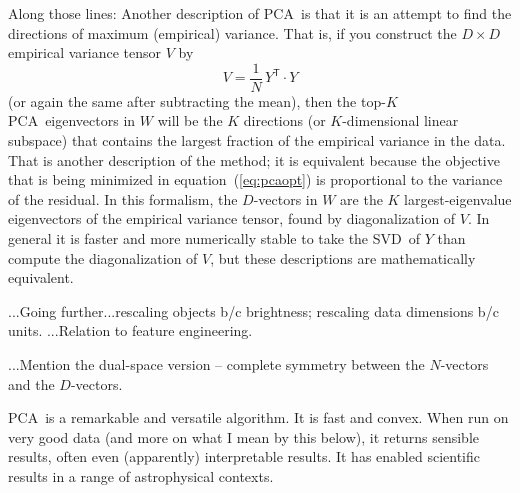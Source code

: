 \documentclass[12pt, twoside, letterpaper]{article}
\newcommand{\equationname}{equation}
\newcommand{\acronym}[1]{{\small{#1}}}
\newcommand{\PCA}{\acronym{PCA}}
\newcommand{\SVD}{\acronym{SVD}}
\newcommand{\T}{^{\mathsf{T}}}
\begin{document}
Along those lines:
Another description of \PCA\ is that it is an attempt to find the directions of
maximum (empirical) variance.
That is, if you construct the $D\times D$ empirical variance tensor $V$ by
\begin{equation}
V = \frac{1}{N}\,Y\T \cdot Y
\end{equation}
(or again the same after subtracting the mean),
then the top-$K$ \PCA\ eigenvectors in $W$ will be the $K$ directions (or $K$-dimensional
linear subspace) that contains the largest fraction of the empirical variance in the data.
That is another description of the method; it is equivalent
because the objective that is being minimized in \equationname~(\ref{eq:pcaopt})
is proportional to the variance of the residual.
In this formalism, the $D$-vectors in $W$ are the $K$ largest-eigenvalue
eigenvectors of the empirical variance tensor, found by diagonalization of $V$.
In general it is faster and more numerically stable to take the \SVD\ of $Y$
than compute the diagonalization of $V$, but these descriptions are mathematically
equivalent.

...Going further...rescaling objects b/c brightness; rescaling data dimensions b/c units.
...Relation to feature engineering.

...Mention the dual-space version -- complete symmetry between the $N$-vectors and the $D$-vectors.

\PCA\ is a remarkable and versatile algorithm.
It is fast and convex.
When run on very good data (and more on what I mean by this below), it returns
sensible results, often even (apparently) interpretable results.
It has enabled scientific results in a range of astrophysical contexts.
\end{document}
